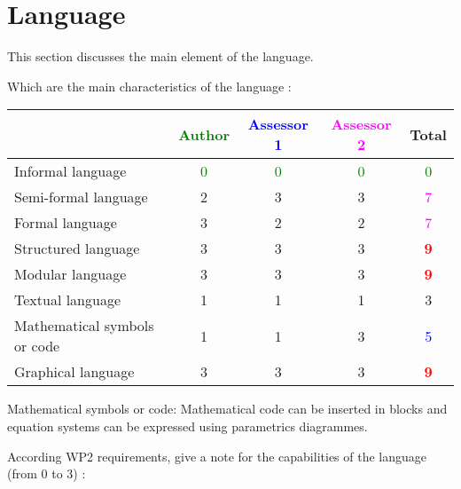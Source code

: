 \section{Language}
This section discusses the main element of the language.

Which are the main characteristics of the language :

\begin{tabular}{|l | c | c | c | c|}
\hline
& \textcolor{green}{Author} & \textcolor{blue}{Assessor 1} & \textcolor{magenta}{Assessor 2} & Total \\
\hline 
Informal language & \textcolor{green}{0} & \textcolor{green}{0} & \textcolor{green}{0} & \textcolor{green}{0} \\
\hline 
Semi-formal language & 2    & 3    & 3    & \textcolor{magenta}{7} \\
\hline
Formal language & 3    & 2    & 2    & \textcolor{magenta}{7} \\
\hline
Structured language &3 & 3    & 3    & \textcolor{red}{\textbf{9}} \\
\hline
Modular language &3 & 3    & 3    & \textcolor{red}{\textbf{9}} \\
\hline
Textual language & 1    & 1    & 1    & 3    \\
\hline
Mathematical symbols or code & 1    & 1    & 3    & \textcolor{blue}{5} \\
\hline
Graphical language & 3    & 3    & 3    & \textcolor{red}{\textbf{9}} \\
\hline
\end{tabular}
\begin{assessor2}
Mathematical symbols or code: Mathematical code can be inserted in blocks and equation systems can be expressed using parametrics diagrammes.
\end{assessor2}



According WP2 requirements, give a note for the capabilities of the language (from 0 to 3) :

